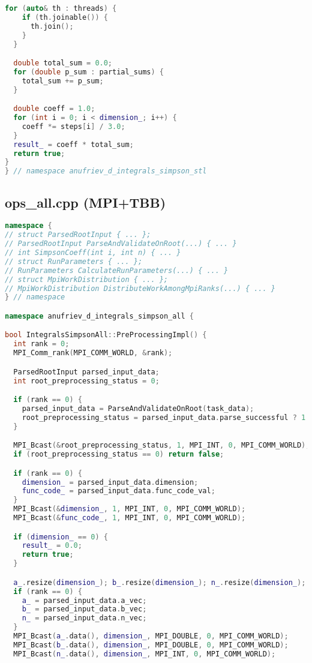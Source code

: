 \documentclass[a4paper,12pt]{article}
\begin{document}
\begin{lstlisting}[language=C++, caption=Ключевые функции из ops\_stl.cpp, basicstyle=\ttfamily\tiny]
  for (auto& th : threads) {
    if (th.joinable()) {
      th.join();
    }
  }

  double total_sum = 0.0;
  for (double p_sum : partial_sums) {
    total_sum += p_sum;
  }

  double coeff = 1.0;
  for (int i = 0; i < dimension_; i++) {
    coeff *= steps[i] / 3.0;
  }
  result_ = coeff * total_sum;
  return true;
}
} // namespace anufriev_d_integrals_simpson_stl
\end{lstlisting}

\newpage
\subsection{ops\_all.cpp (MPI+TBB)}
\begin{lstlisting}[language=C++, caption=Ключевые функции из ops\_all.cpp, basicstyle=\ttfamily\tiny]
namespace { 
// struct ParsedRootInput { ... };
// ParsedRootInput ParseAndValidateOnRoot(...) { ... }
// int SimpsonCoeff(int i, int n) { ... }
// struct RunParameters { ... };
// RunParameters CalculateRunParameters(...) { ... }
// struct MpiWorkDistribution { ... };
// MpiWorkDistribution DistributeWorkAmongMpiRanks(...) { ... }
} // namespace

namespace anufriev_d_integrals_simpson_all {

bool IntegralsSimpsonAll::PreProcessingImpl() {
  int rank = 0;
  MPI_Comm_rank(MPI_COMM_WORLD, &rank);

  ParsedRootInput parsed_input_data;
  int root_preprocessing_status = 0;

  if (rank == 0) {
    parsed_input_data = ParseAndValidateOnRoot(task_data);
    root_preprocessing_status = parsed_input_data.parse_successful ? 1 : 0;
  }

  MPI_Bcast(&root_preprocessing_status, 1, MPI_INT, 0, MPI_COMM_WORLD);
  if (root_preprocessing_status == 0) return false;

  if (rank == 0) {
    dimension_ = parsed_input_data.dimension;
    func_code_ = parsed_input_data.func_code_val;
  }
  MPI_Bcast(&dimension_, 1, MPI_INT, 0, MPI_COMM_WORLD);
  MPI_Bcast(&func_code_, 1, MPI_INT, 0, MPI_COMM_WORLD);

  if (dimension_ == 0) {
    result_ = 0.0;
    return true;
  }

  a_.resize(dimension_); b_.resize(dimension_); n_.resize(dimension_);
  if (rank == 0) {
    a_ = parsed_input_data.a_vec;
    b_ = parsed_input_data.b_vec;
    n_ = parsed_input_data.n_vec;
  }
  MPI_Bcast(a_.data(), dimension_, MPI_DOUBLE, 0, MPI_COMM_WORLD);
  MPI_Bcast(b_.data(), dimension_, MPI_DOUBLE, 0, MPI_COMM_WORLD);
  MPI_Bcast(n_.data(), dimension_, MPI_INT, 0, MPI_COMM_WORLD);


\end{lstlisting}
\end{document}
